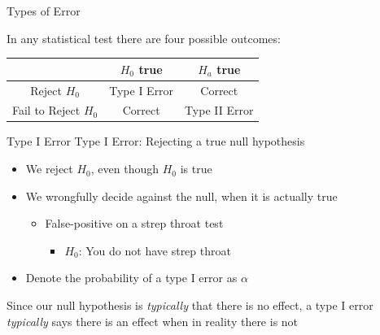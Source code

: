 \documentclass{beamer}
\begin{document}
\begin{frame}{Types of Error}
	
	In any statistical test there are four possible outcomes:

	\begin{center}
		\begin{tabular}{|c|c|c|}
			\hline
			& $H_0$ true & $H_a$ true \\
			\hline
			Reject $H_0$ & Type I Error & Correct \\
			\hline
			Fail to Reject $H_0$ & Correct & Type II Error \\
			\hline
		\end{tabular}
	\end{center}
\end{frame}


\begin{frame}{Type I Error}
	\alert{Type I Error}: Rejecting a true null hypothesis
	
	\begin{itemize}
		\item We reject $H_0$, even though $H_0$ is true
		      
		\item We wrongfully decide against the null, when it is actually true 
		      \begin{itemize}
		      	\item False-positive on a strep throat test
		      	      \begin{itemize}
		      	      	\item $H_0$: You do not have strep throat
		      	      \end{itemize}
		      \end{itemize}
		      
		\item Denote the probability of a type I error as $\alpha$
		
	\end{itemize}
	
	Since our null hypothesis is \textit{typically} that there is no effect, a type I error \textit{typically} says there is an effect when in reality there is not
\end{frame}
\end{document}
